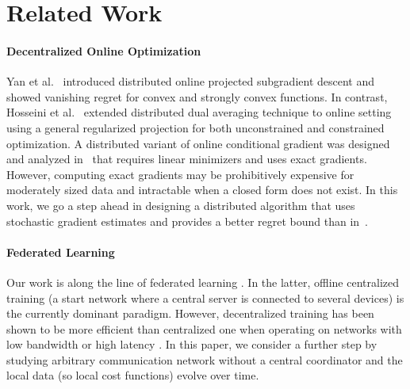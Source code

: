 \section{Related Work}
\label{sec: relatedworks}

\paragraph{Decentralized Online Optimization}  %
%
Yan et al.~\cite{Yan:2013} introduced distributed online projected subgradient descent and showed vanishing regret for convex and strongly convex functions. 
In contrast, Hosseini et al.~\cite{Hosseini:2013} extended distributed dual averaging technique to online setting using a general regularized projection for both unconstrained and constrained optimization. 
A distributed variant of online conditional gradient \cite{Hazanothers16:Introduction-to-online} was designed and analyzed in~\cite{Zhang:2017} that requires linear minimizers and uses exact gradients. 
However, computing exact gradients may be prohibitively expensive for moderately sized data and intractable when a closed form does not exist. 
In this work, we go a step ahead in designing a distributed algorithm that uses stochastic gradient estimates and provides a better regret bound than in~\cite{Zhang:2017}.



\paragraph{Federated Learning} Our work is along the line of federated learning \cite{McMahanothers:Advances-and-Open,LiSahu20:Federated-learning:} \cite{federatedLearning2017}. 
In the latter, offline centralized training (a start network where a central server is connected to several devices) is the currently dominant paradigm. 
However, decentralized training has been shown to be more efficient 
than centralized one when operating on networks with low bandwidth or high latency \cite{LianZhang17:Can-decentralized-algorithms,HeBian18:Cola:-Decentralized}. 
In this paper, we consider a further step by studying arbitrary communication network without a central coordinator and the local data (so local cost functions) evolve over time.  

